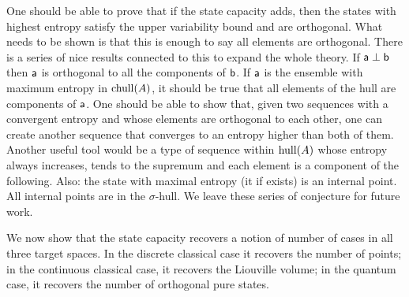 One should be able to prove that if the state capacity adds, then the states with highest entropy satisfy the upper variability bound and are orthogonal. What needs to be shown is that this is enough to say all elements are orthogonal. There is a series of nice results connected to this to expand the whole theory. If $\ens[a] \ortho \ens[b]$ then $\ens[a]$ is orthogonal to all the components of $\ens[b]$. If $\ens[a]$ is the ensemble with maximum entropy in $\chull(A)$, it should be true that all elements of the hull are components of $\ens[a]$. One should be able to show that, given two sequences with a convergent entropy and whose elements are orthogonal to each other, one can create another sequence that converges to an entropy higher than both of them. Another useful tool would be a type of sequence within $\hull(A)$ whose entropy always increases, tends to the supremum and each element is a component of the following. Also: the state with maximal entropy (it if exists) is an internal point. All internal points are in the $\sigma$-hull. We leave these series of conjecture for future work.

We now show that the state capacity recovers a notion of number of cases in all three target spaces. In the discrete classical case it recovers the number of points; in the continuous classical case, it recovers the Liouville volume; in the quantum case, it recovers the number of orthogonal pure states.

